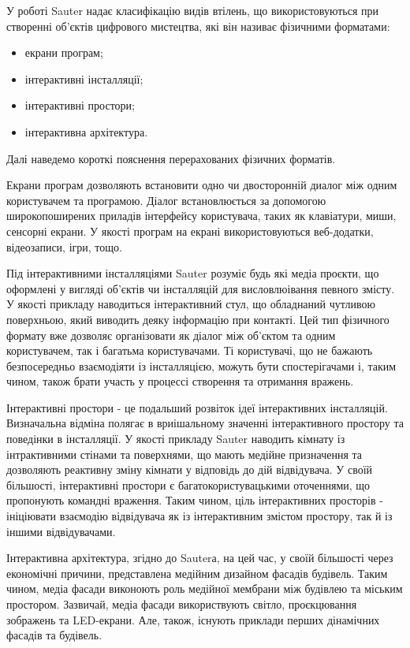 \documentclass[a4paper,ukrainian,utf8,nocolumnsxix,floatsection]{eskdtext}
\begin{document}
У роботі  Sauter надає класифікацію видів втілень, що використовуються при створенні об’єктів цифрового мистецтва, які він називає фізичними форматами:

\begin{itemize}
	\item екрани програм;
	\item інтерактивні інсталляції;
	\item інтерактивні простори;
	\item інтерактивна архітектура.
\end{itemize}

Далі наведемо короткі пояснення перерахованих фізичних форматів.

Екрани програм дозволяють встановити одно чи двосторонній диалог між одним користувачем та програмою. Діалог встановлюється за допомогою широкопоширених приладів інтерфейсу користувача, таких як клавіатури, миши, сенсорні екрани. У якості програм на екрані використовуються веб-додатки, відеозаписи, ігри, тощо.

Під інтерактивними інсталляціями Sauter розуміє будь які медіа проєкти, що оформлені у вигляді об’єктів чи інсталляцій для висловлюівання певного змісту. У якості прикладу наводиться інтерактивний стул, що обладнаний чутливою поверхньою, який виводить деяку інформацію при контакті. Цей тип фізичного формату вже дозволяє організовати як діалог між об’єктом та одним користувачем, так і багатьма користувачами. Ті користувачі, що не бажають безпосередньо взаємодіяти із інсталляцією, можуть бути спостерігачами і, таким чином, також брати участь у процессі створення та отримання вражень. 

Інтерактивні простори - це подальший розвіток ідеї інтерактивних інсталляцій. Визначальна відміна полягає в вриішальному значенні інтерактивного простору та поведінки в інсталляції. У якості прикладу Sauter наводить кімнату із інтрактивними стінами та поверхнями, що мають медійне призначення та дозволяють реактивну зміну кімнати у відповідь до дій відвідувача. У своїй більшості, інтерактивні простори є багатокористувацькими оточеннями, що пропонують командні враження. Таким чином, ціль інтерактивних просторів - ініціювати взаємодію відвідувача як із інтерактивним змістом простору, так й із іншими відвідувачами.

Інтерактивна архітектура, згідно до Sauterа, на цей час, у своїй більшості через економічні причини, представлена медійним дизайном фасадів будівель. Таким чином, медіа фасади виконоють роль медійної мембрани між будівлею та міським простором. Зазвичай, медіа фасади використвують світло, проєкцювання зображень та LED-екрани. Але, також, існують приклади перших дінамічних фасадів та будівель.
\end{document}
